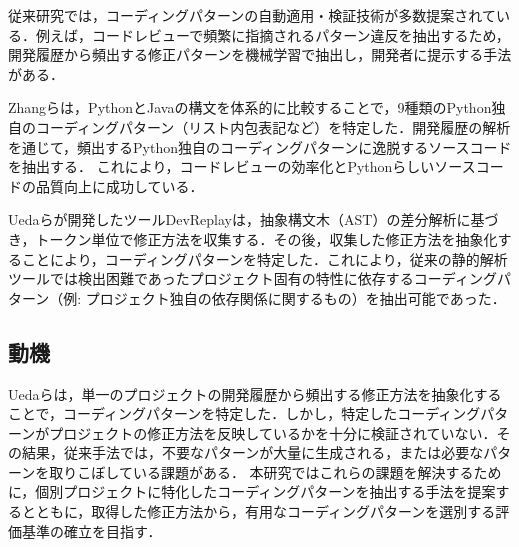\documentclass[11pt]{jreport}
\begin{document}
従来研究では，コーディングパターンの自動適用・検証技術が多数提案されている．例えば，コードレビューで頻繁に指摘されるパターン違反を抽出するため，開発履歴から頻出する修正パターンを機械学習で抽出し，開発者に提示する手法がある\cite{AutomaticPatch}\cite{findBugs}\cite{Relntancer}\cite{don'tDIY}．

Zhangらは，PythonとJavaの構文を体系的に比較することで，9種類のPython独自のコーディングパターン（リスト内包表記など）を特定した．開発履歴の解析を通じて，頻出するPython独自のコーディングパターンに逸脱するソースコードを抽出する．
これにより，コードレビューの効率化とPythonらしいソースコードの品質向上に成功している．

Uedaらが開発したツールDevReplay\cite{devreplay}は，抽象構文木（AST）の差分解析に基づき，トークン単位で修正方法を収集する．その後，収集した修正方法を抽象化することにより，コーディングパターンを特定した．これにより，従来の静的解析ツールでは検出困難であったプロジェクト固有の特性に依存するコーディングパターン（例: プロジェクト独自の依存関係に関するもの）を抽出可能であった．

\subsection{動機}
Uedaらは，単一のプロジェクトの開発履歴から頻出する修正方法を抽象化することで，コーディングパターンを特定した．しかし，特定したコーディングパターンがプロジェクトの修正方法を反映しているかを十分に検証されていない．その結果，従来手法では，不要なパターンが大量に生成される，または必要なパターンを取りこぼしている課題がある．
本研究ではこれらの課題を解決するために，個別プロジェクトに特化したコーディングパターンを抽出する手法を提案するとともに，取得した修正方法から，有用なコーディングパターンを選別する評価基準の確立を目指す．


\end{document}
